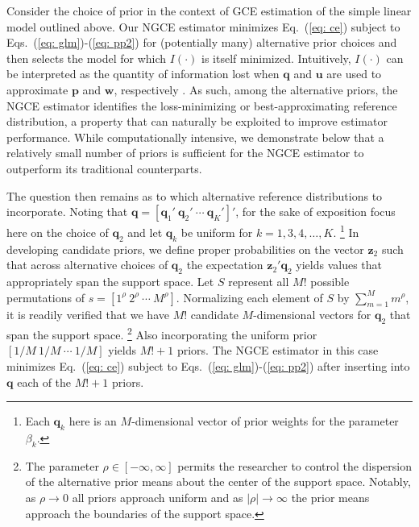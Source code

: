 \documentclass{elsarticle}
\begin{document}
Consider the choice of prior in the context of GCE estimation of the simple 
linear model outlined above.
Our NGCE estimator minimizes Eq.\ (\ref{eq: ce}) subject to 
Eqs.\ (\ref{eq: glm})-(\ref{eq: pp2}) for (potentially many) alternative prior 
choices and then selects the model for which $I(\cdot)$ is itself minimized.
Intuitively, $I(\cdot)$ can be interpreted as the quantity of information lost
when $\mathbf{q}$ and $\mathbf{u}$ are used to approximate $\mathbf{p}$
and $\mathbf{w}$, respectively \citep{burnham2002}.
As such, among the alternative priors, the NGCE estimator identifies the 
loss-minimizing or best-approximating reference distribution, a property that
can naturally be exploited to improve estimator performance.
While computationally intensive, we demonstrate below that a relatively small 
number of priors is sufficient for the NGCE estimator to outperform its 
traditional counterparts.

The question then remains as to which alternative reference distributions to 
incorporate.
Noting that $\mathbf{q}=[\mathbf{q}_1' ~ \mathbf{q}_2' ~ 
\cdots ~ \mathbf{q}_K' ]'$, for the sake of exposition focus here on the 
choice of $\mathbf{q}_2$ and let $\mathbf{q}_k$ be uniform for 
$k=1,3,4,\ldots, K$.%
\footnote{Each $\mathbf{q}_k$ here is an $M$-dimensional vector of 
 prior weights for the parameter $\beta_k$.}
In developing candidate priors, we define proper probabilities on the vector 
$\mathbf{z}_2$ such that across alternative choices of $\mathbf{q}_2$ the 
expectation $\mathbf{z}_2'\mathbf{q}_2$  yields values that appropriately
span the support space. 
Let $S$ represent all  $M!$ possible permutations of 
$s = [1^\rho ~ 2^\rho ~ \cdots ~ M^\rho]$.
Normalizing each element of $S$ by $\sum_{m=1}^M m^\rho$, it is 
readily verified that we have $M!$ candidate $M$-dimensional vectors for 
$\mathbf{q}_2$ that span the support space.%
\footnote{The parameter $\rho \in [-\infty, \infty]$ permits the researcher
to control the dispersion of the alternative prior means about the center of the 
support space.
Notably, as $\rho \to 0$ all priors approach uniform and as $|\rho| \to 
\infty$ the prior means approach the boundaries of the support space.}
Also incorporating the uniform prior $[1/M ~ 1/M ~ \cdots ~ 1/M]$ yields 
$M! + 1$ priors.
The NGCE estimator in this case minimizes Eq.\ (\ref{eq: ce}) subject 
to Eqs.\ (\ref{eq: glm})-(\ref{eq: pp2}) after inserting into $\mathbf{q}$ 
each of the $M! + 1$ priors.

\end{document}
